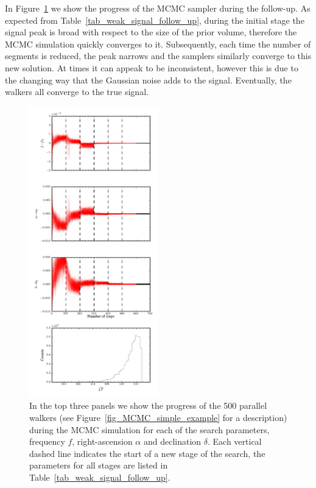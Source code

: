 \documentclass[aps, prd, twocolumn, superscriptaddress, floatfix, showpacs, nofootinbib, longbibliography]{revtex4-1}
\begin{document}
In Figure~\ref{fig_follow_up} we show the progress of the MCMC sampler during
the follow-up.  As expected from Table~\ref{tab_weak_signal_follow_up}, during
the initial stage the signal peak is broad with respect to the size of the
prior volume, therefore the MCMC simulation quickly converges to it. Subsequently,
each time the number of segments is reduced, the peak narrows and the samplers
similarly converge to this new solution. At times it can appeak to be inconsistent,
however this is due to the changing way that the Gaussian noise adds to the signal.
Eventually, the walkers all converge to the true signal.
\begin{figure}[htb]
\centering \includegraphics[width=0.5\textwidth]{weak_signal_follow_up_walkers}
\caption{In the top three panels we show the progress of the 500 parallel
walkers (see Figure~\ref{fig_MCMC_simple_example} for a description) during the
MCMC simulation for each of the search parameters, frequency $f$,
right-ascension $\alpha$ and declination $\delta$. Each vertical dashed line
indicates the start of a new stage of the search, the parameters for all stages
are listed in Table~\ref{tab_weak_signal_follow_up}.}
\label{fig_follow_up}
\end{figure}
\end{document}
